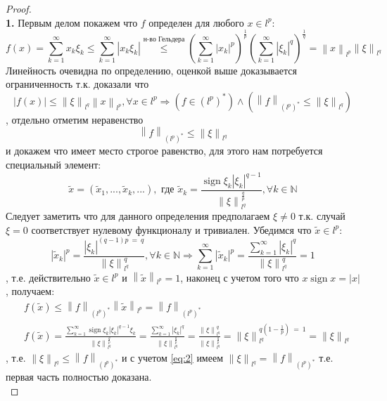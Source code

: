 \documentclass[12pt,a4paper]{article}
\theoremstyle{definition}
\newcommand{\Natural}{\mathbb{N}}
\newcommand{\norm}[1]{\left\lVert#1\right\rVert}
\DeclareMathOperator{\sign}{sign}
\newcommand{\conj}[1]{\left(#1\right)^*}
\begin{document}
\begin{proof}
	$ $ \\
	
	\textbf{1.} Первым делом покажем что $f$ определен для любого $x \in l^p$:
	$$f(x) = \sum\limits_{k=1}^{\infty}{x_k \xi_k} \leq \sum\limits_{k=1}^{\infty}{|x_k \xi_k|} \overset{\text{н-во Гельдера}}{\leq} 
	\left(\sum\limits_{k=1}^{\infty}{|x_k|^p}\right)^\frac{1}{p} \left(\sum\limits_{k=1}^{\infty}{|\xi_k|^q}\right)^\frac{1}{q} = \norm{x}_{l^p} \norm{\xi}_{l^q} $$
	Линейность очевидна по определению, оценкой выше доказывается ограниченность т.к. доказали что 
	$$|f(x)| \leq \norm{\xi}_{l^q} \norm{x}_{l^p}, \forall x \in l^p \Rightarrow
	(f \in \conj{l^p}) \wedge (\norm{f}_{\conj{l^p}} \leq \norm{\xi}_{l^q})$$
	, отдельно отметим неравенство
	\begin{equation}\label{eq:2}
		\norm{f}_{\conj{l^p}} \leq \norm{\xi}_{l^q}
	\end{equation}
	и докажем что имеет место строгое равенство, для этого нам потребуется специальный элемент:
	$$\tilde{x} = (\tilde{x}_1, ..., \tilde{x}_k, ...), \text{ где } 
	\tilde{x}_k = \frac{\sign{\xi_k} |\xi_k|^{q-1}}{\norm{\xi}_{l^q}^{\frac{q}{p}}}, \forall k \in \Natural$$
	Следует заметить что для данного определения предполагаем $\xi \neq 0$ т.к. случай $\xi = 0$ соответствует нулевому функционалу и тривиален. Убедимся что $\tilde{x} \in l^p$:
	$$|\tilde{x}_k|^p = \frac{|\xi_k|^{(q-1)p \ = \ q}}{\norm{\xi}_{l^q}^q}, \forall k \in \Natural \Rightarrow \sum\limits_{k=1}^{\infty}{|\tilde{x}_k|^p} =  \frac{\sum\limits_{k=1}^{\infty}{|\xi_k|^q}}{\norm{\xi}_{l^q}^q} = 1$$
	, т.е. действительно $\tilde{x} \in l^p$ и $\norm{\tilde{x}}_{l^p} = 1$, наконец с учетом того что $x\sign{x} = |x|$, получаем:
	\begin{align*}
		&f(\tilde{x}) \leq \norm{f}_{\conj{l^p}}\norm{\tilde{x}}_{l^p} = \norm{f}_{\conj{l^p}} \\ 
		&f(\tilde{x}) = \frac{\sum\limits_{k=1}^{\infty}{\sign{\xi_k}|\xi_k|^{q-1}\xi_k}}{\norm{\xi}_{l^q}^{\frac{q}{p}}} = \frac{\sum\limits_{k=1}^{\infty}{|\xi_k|^q}}{\norm{\xi}_{l^q}^{\frac{q}{p}}} = \frac{\norm{\xi}_{l^q}^q}{\norm{\xi}_{l^q}^{\frac{q}{p}}} = \norm{\xi}_{l^q}^{q(1 - \frac{1}{p}) \ = \ 1} = \norm{\xi}_{l^q}
	\end{align*}
	, т.е. $\norm{\xi}_{l^q} \leq \norm{f}_{\conj{l^p}}$ и с учетом \eqref{eq:2} имеем $\norm{\xi}_{l^q} = \norm{f}_{\conj{l^p}}$ т.е. первая часть полностью доказана.
	\\
	

\end{proof}
\end{document}
